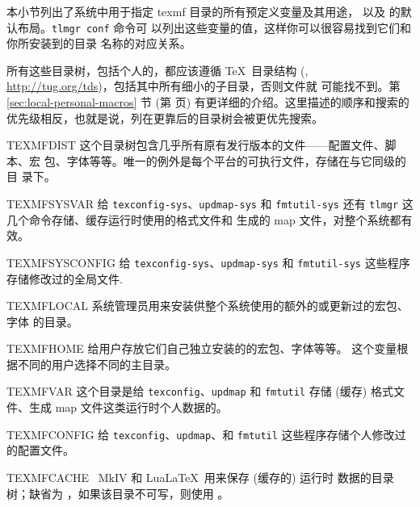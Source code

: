\documentclass{article}
\begin{document}
本小节列出了系统中用于指定 texmf 目录的所有预定义变量及其用途，
以及 \TL{} 的默认布局。\texttt{tlmgr~conf} 命令可
以列出这些变量的值，这样你可以很容易找到它们和你所安装到的目录
名称的对应关系。

所有这些目录树，包括个人的，都应该遵循 \TeX\ 目录结构 (\TDS,
\url{http://tug.org/tds})，包括其中所有细小的子目录，否则文件就
可能找不到。第 \ref{sec:local-personal-macros} 节 (第
\pageref{sec:local-personal-macros} 页) 有更详细的介绍。这里描述的顺序和搜索的
优先级相反，也就是说，列在更靠后的目录树会被更优先搜索。

\begin{ttdescription}
\item [TEXMFDIST] 这个目录树包含几乎所有原有发行版本的文件——配置文件、脚本、宏
包、字体等等。唯一的例外是每个平台的可执行文件，存储在与它同级的  目
录下。
\item [TEXMFSYSVAR] 给 \verb+texconfig-sys+、\verb+updmap-sys+ 和
\verb+fmtutil-sys+ 还有 \verb+tlmgr+ 这几个命令存储、缓存运行时使用的格式文件和
生成的 map 文件，对整个系统都有效。
\item [TEXMFSYSCONFIG] 给 \verb+texconfig-sys+、\verb+updmap-sys+ 和
\verb+fmtutil-sys+ 这些程序存储修改过的全局文件.
\item [TEXMFLOCAL] 系统管理员用来安装供整个系统使用的额外的或更新过的宏包、字体
的目录。
\item [TEXMFHOME] 给用户存放它们自己独立安装的的宏包、字体等等。
这个变量根据不同的用户选择不同的主目录。
\item [TEXMFVAR] 这个目录是给 \verb+texconfig+、\verb+updmap+ 和
  \verb+fmtutil+ 存储 (缓存) 格式文件、生成 map 文件这类运行时个人数据的。
\item [TEXMFCONFIG] 给 \verb+texconfig+、\verb+updmap+、和 \verb+fmtutil+
这些程序存储个人修改过的配置文件。
\item [TEXMFCACHE] \ConTeXt\ MkIV 和 Lua\LaTeX\ 用来保存 (缓存的) 运行时
数据的目录树；缺省为 ，如果该目录不可写，则使用
。
\end{ttdescription}
\end{document}
